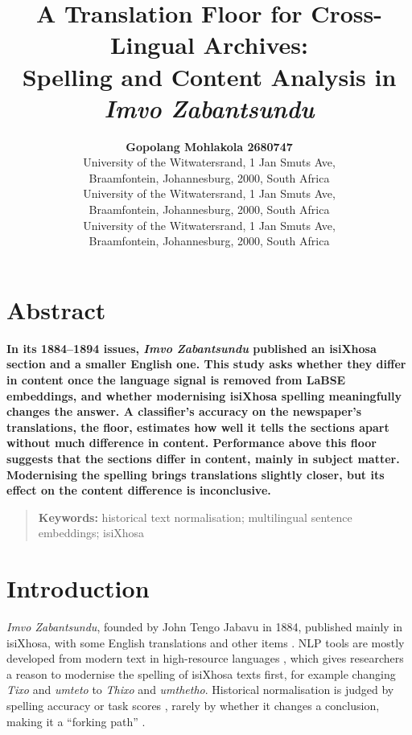 \documentclass[10pt,letterpaper]{article}
\title{A Translation Floor for Cross-Lingual Archives:\\ Spelling and Content Analysis in \emph{Imvo Zabantsundu}}
\author{{\large \bf Gopolang Mohlakola 2680747} \\ University of the Witwatersrand, 1 Jan Smuts Ave,\\ Braamfontein, Johannesburg, 2000, South Africa
  \AND {\large \bf Tawananyasha Kadango 2588206} \\ University of the Witwatersrand, 1 Jan Smuts Ave,\\ Braamfontein, Johannesburg, 2000, South Africa
  \AND {\large \bf Lily de Melo 2545080} \\ University of the Witwatersrand, 1 Jan Smuts Ave,\\ Braamfontein, Johannesburg, 2000, South Africa}
\begin{document}
\maketitle
\phantom{.}
\newpage
\phantom{.}
\newpage
\setlength{\parindent}{0pt}
\section{Abstract}
{
\bf
{}
In its 1884--1894 issues, \emph{Imvo Zabantsundu} published an isiXhosa section and a smaller English one.
This study asks whether they differ in content once the language signal is removed from LaBSE embeddings,
and whether modernising isiXhosa spelling meaningfully changes the answer. A classifier's accuracy on the
newspaper's translations, the floor, estimates how well it tells the sections apart without much difference
in content. Performance above this floor suggests that the sections differ in content, mainly in subject
matter. Modernising the spelling brings translations slightly closer, but its effect on the content
difference is inconclusive.
}
\begin{quote}
\small
\textbf{Keywords:}
historical text normalisation; multilingual sentence embeddings; isiXhosa
\end{quote}

\section{Introduction} \label{Intro}
\emph{Imvo Zabantsundu}, founded by John Tengo Jabavu in 1884, published mainly in isiXhosa, with some
English translations and other items \citep{schoots}. NLP tools are mostly developed from modern text in
high-resource languages \citep{joshi}, which gives researchers a reason to modernise the spelling of
isiXhosa texts first, for example changing \emph{Tixo} and \emph{umteto} to \emph{Thixo} and \emph{umthetho}.
Historical normalisation is judged by spelling accuracy or task scores \citep{bollmann}, rarely by whether it
changes a conclusion, making it a ``forking path'' \citep{gelman}.
\end{document}
